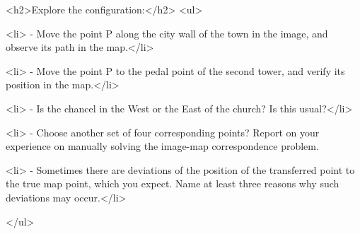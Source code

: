     <h2>Explore the configuration:</h2>
    <ul>

      <li> - Move the point P along the city wall of the town in the image, and observe its path in the map.</li>
 			
 			<li> - Move the point P to the pedal point of the second tower, and verify its position in the map.</li>
 			
 			<li> - Is the chancel in the West or the East of the church? Is this usual?</li> 
 			
	    <li> - Choose another set of four corresponding points? Report on your experience on manually solving the image-map correspondence problem.
	    
	    <li> - Sometimes there are deviations of the position of the transferred point to the true map point, which you expect. 
			       Name at least three reasons why such deviations may occur.</li>
	    
	   
    </ul>
